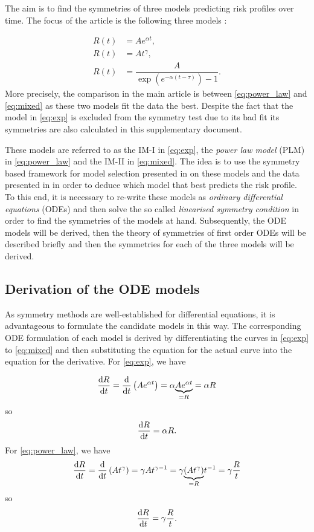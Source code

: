 The aim is to find the symmetries of three models predicting risk profiles over time. The focus of the article is the following three models \cite{Palmer1883}:

\begin{align}
R(t)&=Ae^{\alpha t},\label{eq:exp}\\
R(t)&=At^{\gamma},\label{eq:power_law}\\
R(t)&=\dfrac{A}{\exp\left(e^{-\alpha(t-\tau)}\right)-1}.\label{eq:mixed}
\end{align}
More precisely, the comparison in the main article is between \eqref{eq:power_law} and \eqref{eq:mixed} as these two models fit the data the best. Despite the fact that the model in \eqref{eq:exp} is excluded from the symmetry test due to its bad fit its symmetries are also calculated in this supplementary document. 

These models are referred to as the IM-I in \eqref{eq:exp}, the \textit{power law model} (PLM) in \eqref{eq:power_law} and the IM-II in \eqref{eq:mixed}. The idea is to use the symmetry based framework for model selection presented in \cite{ohlsson2020symmetry} on these models and the data presented in \cite{Palmer1883} in order to deduce which model that best predicts the risk profile. To this end, it is necessary to re-write these models as \textit{ordinary differential equations} (ODEs) and then solve the so called \textit{linearised symmetry condition} \cite{hydon2000symmetry} in order to find the symmetries of the models at hand. Subsequently, the ODE models will be derived, then the theory of symmetries of first order ODEs will be described briefly and then the symmetries for each of the three models will be derived.


\subsection{Derivation of the ODE models}
As symmetry methods are well-established for differential equations, it is advantageous to formulate the candidate models in this way. The corresponding ODE formulation of each model is derived by differentiating the curves in \eqref{eq:exp} to \eqref{eq:mixed} and then substituting the equation for the actual curve into the equation for the derivative. For \eqref{eq:exp}, we have

$$\dv{R}{t}=\dv{}{t}\left(Ae^{\alpha t}\right)=\alpha \underset{=R}{\underbrace{Ae^{\alpha t}}}=\alpha R$$
so
$$\dv{R}{t}=\alpha R.$$
For \eqref{eq:power_law}, we have
$$\dv{R}{t}=\dv{}{t}\left(At^{\gamma}\right)=\gamma A t^{\gamma-1}=\gamma\underset{=R}{\underbrace{\left(At^{\gamma}\right)}}t^{-1}=\gamma\dfrac{R}{t}$$
so
$$\dv{R}{t}=\gamma\dfrac{R}{t}.$$

